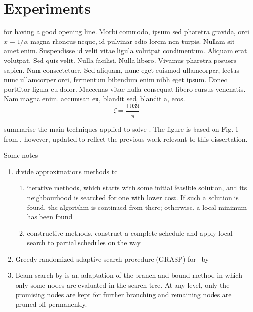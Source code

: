 

\chapter{Experiments }\label{ch:experiments} 

 for having a good opening line. Morbi commodo, ipsum sed pharetra gravida, orci  $x = 1/\alpha$ magna rhoncus neque, id pulvinar odio lorem non turpis. Nullam sit amet enim. Suspendisse id velit vitae ligula volutpat condimentum. Aliquam erat volutpat. Sed quis velit. Nulla facilisi. Nulla libero. Vivamus pharetra posuere sapien. Nam consectetuer. Sed aliquam, nunc eget euismod ullamcorper, lectus nunc ullamcorper orci, fermentum bibendum enim nibh eget ipsum. Donec porttitor ligula eu dolor. Maecenas vitae nulla consequat libero cursus venenatis. Nam magna enim, accumsan eu, blandit sed, blandit a, eros.
$$\zeta = \frac{1039}{\pi}$$

\clearpage

 summarise the main techniques applied to solve \JSP. The 
figure is based on Fig. 1 from \citet{Jain99}, however, updated to reflect the 
previous work relevant to this dissertation.

Some notes
\begin{enumerate}
    \item \cite{LocalSearch} divide approximations methods to 
    \begin{enumerate}
        \item iterative methods, which starts with some initial feasible 
        solution, and its neighbourhood is searched for one with lower cost. If 
        such a solution is found, the algorithm is
        continued from there; otherwise, a local minimum has been found
        \item constructive methods, construct a complete schedule and apply 
        local search to partial schedules on the way
    \end{enumerate}
    \item Greedy randomized adaptive search procedure (GRASP) for \JSP\ by 
    \cite{GRASP}
    \item Beam search by \cite{BeamSearch} is an adaptation of the branch and 
    bound method in which only some nodes are evaluated in the search tree. At 
    any level, only the promising nodes are kept for further branching and 
    remaining nodes are pruned off permanently.
\end{enumerate}

